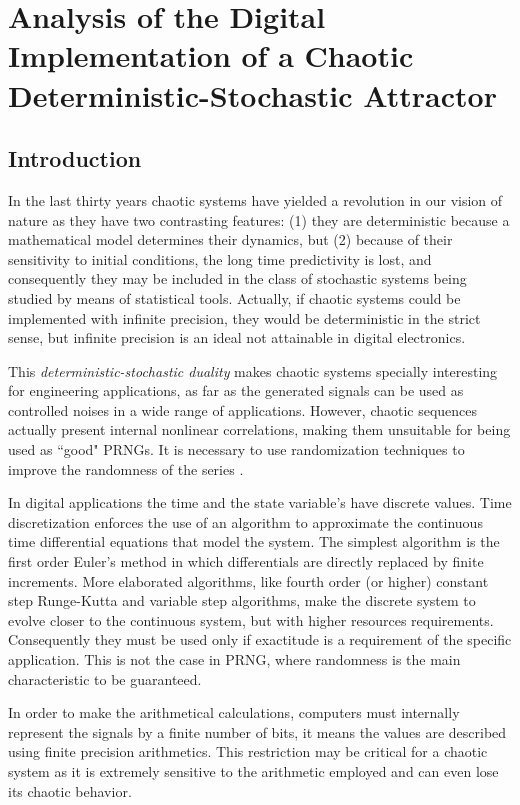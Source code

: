 \section{Analysis of the Digital Implementation of a Chaotic Deterministic-Stochastic Attractor }

\subsection{Introduction}
In the last thirty years chaotic systems have yielded a revolution
in our vision of nature as they have two contrasting features:
(1) they are deterministic because a mathematical model determines
their dynamics, but (2) because of their sensitivity to initial
conditions, the long time predictivity is lost, and consequently
they may be included in the class of stochastic systems being
studied by means of statistical tools. Actually, if chaotic
systems could be implemented with infinite precision, they would
be deterministic in the strict sense, but infinite precision is an ideal not
attainable in digital electronics.

This \emph{deterministic-stochastic duality} makes chaotic systems
specially interesting for engineering applications, as far as the
generated signals can be used as controlled noises in a wide range
of applications. However, chaotic sequences actually present
internal nonlinear correlations, making them unsuitable for being used as
``good" PRNGs. It is necessary to use randomization techniques to
improve the randomness of the series \cite{DeMicco2008}.

In digital applications the time and the state variable's
have discrete values. Time discretization enforces the use of
an algorithm to approximate the continuous time differential equations
that model the system. The simplest algorithm is the first order Euler's
method in which differentials are directly replaced by finite
increments. More elaborated algorithms, like fourth order (or
higher) constant step Runge-Kutta and variable
step algorithms, make the discrete system to evolve closer to the
continuous system, but with higher resources requirements. Consequently they must be used only if exactitude is a requirement of the specific application. This is not the case in PRNG, where randomness is the main characteristic to be guaranteed.

In order to make the arithmetical calculations, computers must internally represent
the signals by a finite number of bits, it means the values are
described using finite precision arithmetics. This restriction may
be critical for a chaotic system as it is extremely sensitive to
the arithmetic employed and can even lose its chaotic behavior.

